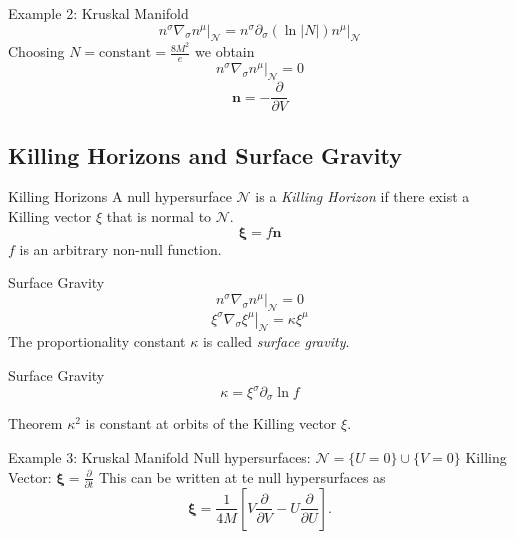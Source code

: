 \documentclass{beamer}
\begin{document}
        \begin{frame}{Example 2: Kruskal Manifold}
        	$$\left.n^{\sigma}\nabla_{\sigma}n^{\mu}\right|_{\mathcal{N}}  =  
          	\left.n^{\sigma} \partial_{\sigma} \left(\ln\left|N\right|\right)n^{\mu} 
          	\right|_{\mathcal{N}}$$
            \pause
			Choosing $N = \textrm{constant} = \frac{8M^{2}}{e}$ we obtain
            \pause
            $$\left.n^{\sigma}\nabla_{\sigma}n^{\mu}\right|_{\mathcal{N}}  = 0 $$
            \pause
            $$ \mathbf{n}=-\frac{\partial}{\partial V}$$
        \end{frame}
        
        
   	\begin{darkframes} 
    	\subsection{Killing Horizons and Surface Gravity}
        \begin{frame}{Killing Horizons}
        	A null hypersurface $\mathcal{N}$ is a \emph{Killing Horizon} if
there exist a Killing vector  $\xi$ that is
normal to $\mathcal{N}$.
			\pause
        	$$\mathbf{\xi}=f\mathbf{n}$$ 
            \pause
            $f$ is an arbitrary non-null function.
        \end{frame}
        
        \begin{frame}{Surface Gravity}
        $$ \left.n^{\sigma}\nabla_{\sigma}n^{\mu}\right|_{\mathcal{N}}=0$$
 		\pause
        $$ \left.\xi^{\sigma}\nabla_{\sigma}\xi^{\mu}\right|_{\mathcal{N}} = 
        \kappa\xi^{\mu}$$
        \pause
        \centering
		{The proportionality constant $\kappa$ is called \emph{surface gravity}.}
        \end{frame}
        
        \begin{frame}{Surface Gravity}
        	$$\kappa=\xi^{\sigma}\partial_{\sigma}\ln f$$
            \pause
            \begin{block}{Theorem}
        	$\kappa^{2}$ is constant at orbits of the Killing vector $\xi$.\\
      		\end{block}
        \end{frame}
        
	\end{darkframes}    
  
        \begin{frame}{Example 3: Kruskal Manifold}
           	Null hypersurfaces: $\mathcal{N}=\{U=0\}\cup\{V=0\}$
            \pause
            Killing Vector:
            $\mathbf{\xi}=\frac{\partial}{\partial t}$
            This can be written at te null hypersurfaces as
            \begin{equation*}
			\mathbf{\xi}=\frac{1}{4M}\left[V\frac{\partial}{\partial V}-U\frac{\partial}{\partial U}\right].\label{eq:aux14}
			\end{equation*}
        \end{frame}
        
\end{document}

